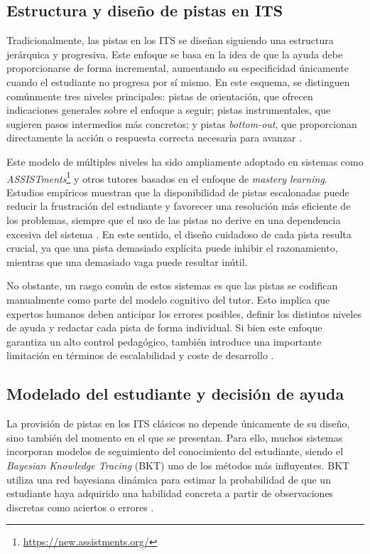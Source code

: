 \documentclass[../main.tex]{subfiles}
\begin{document}
\subsection{Estructura y diseño de pistas en ITS}

Tradicionalmente, las pistas en los ITS se diseñan siguiendo una estructura jerárquica y progresiva. Este enfoque se basa en la idea de que la ayuda debe proporcionarse de forma incremental, aumentando su especificidad únicamente cuando el estudiante no progresa por sí mismo. En este esquema, se distinguen comúnmente tres niveles principales: pistas de orientación, que ofrecen indicaciones generales sobre el enfoque a seguir; pistas instrumentales, que sugieren pasos intermedios más concretos; y pistas \textit{bottom-out}, que proporcionan directamente la acción o respuesta correcta necesaria para avanzar \cite{Aleven2003, KoedingerAleven2007}.

Este modelo de múltiples niveles ha sido ampliamente adoptado en sistemas como \textit{ASSISTments}\footnote{\url{https://new.assistments.org/}} y otros tutores basados en el enfoque de \textit{mastery learning}. Estudios empíricos muestran que la disponibilidad de pistas escalonadas puede reducir la frustración del estudiante y favorecer una resolución más eficiente de los problemas, siempre que el uso de las pistas no derive en una dependencia excesiva del sistema \cite{FengHeffernan2009}. En este sentido, el diseño cuidadoso de cada pista resulta crucial, ya que una pista demasiado explícita puede inhibir el razonamiento, mientras que una demasiado vaga puede resultar inútil.

No obstante, un rasgo común de estos sistemas es que las pistas se codifican manualmente como parte del modelo cognitivo del tutor. Esto implica que expertos humanos deben anticipar los errores posibles, definir los distintos niveles de ayuda y redactar cada pista de forma individual. Si bien este enfoque garantiza un alto control pedagógico, también introduce una importante limitación en términos de escalabilidad y coste de desarrollo \cite{VanLehn2006}.

\subsection{Modelado del estudiante y decisión de ayuda}

La provisión de pistas en los ITS clásicos no depende únicamente de su diseño, sino también del momento en el que se presentan. Para ello, muchos sistemas incorporan modelos de seguimiento del conocimiento del estudiante, siendo el \textit{Bayesian Knowledge Tracing} (BKT) uno de los métodos más influyentes. BKT utiliza una red bayesiana dinámica para estimar la probabilidad de que un estudiante haya adquirido una habilidad concreta a partir de observaciones discretas como aciertos o errores \cite{CorbettAnderson1995KT}.
\end{document}
